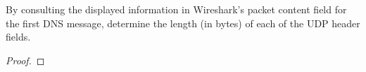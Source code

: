 \documentclass[../../main.tex]{subfiles}
\begin{document}
\begin{wts}
By consulting the displayed information in Wireshark’s packet content field for the first DNS message, determine the length (in bytes) of each of the UDP header fields.
\end{wts}
\begin{proof}

\end{proof}
\end{document}
